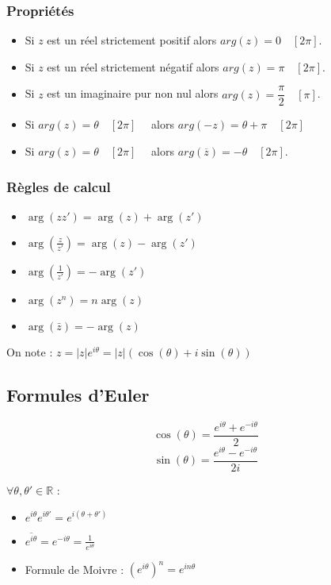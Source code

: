 \documentclass[french]{yLectureNote}
\begin{document}
\subsubsection{Propriétés}
\begin{itemize}
\item Si $z$ est un réel strictement positif alors $arg(z)=0 \quad [2\pi]$.
\item Si $z$ est un réel strictement négatif alors $arg(z)=\pi \quad [2\pi]$.
\item Si $z$ est un imaginaire pur non nul alors $arg(z)=\dfrac{\pi}{2} \quad [\pi]$.
\item Si $arg(z)=\theta \quad [2\pi]\quad $ alors $arg(-z)=\theta+\pi \quad [2\pi]\quad $
\item Si $arg(z)=\theta \quad [2\pi]\quad $ alors  $arg \left( \overline{z}\right) =-\theta \quad [2\pi] $.
\end{itemize}
\subsubsection{Règles de calcul}
\begin{itemize}
\item $\arg(zz') = \arg(z)+\arg(z')$
\item $\arg(\frac{z}{z'}) = \arg(z)-\arg(z')$
\item$\arg(\frac{1}{z'}) = -\arg(z')$
\item$\arg(z^n) = n\arg(z)$
\item$\arg(\bar{z}) = -\arg(z)$
\end{itemize}

On note : $z = |z| e^{i\theta} = |z|( \cos(\theta) + i\sin(\theta))$
\subsection{Formules d'Euler}
\begin{theorem}
\[\cos(\theta) = \frac{e^{i\theta}+e^{-i\theta}}{2}\]
\[\sin(\theta) = \frac{e^{i\theta}-e^{-i\theta}}{2i}\]
\end{theorem}
\begin{theorem}[Propriétés]
$\forall \theta,\theta' \in\mathbb{R}$ :
\begin{itemize}
 \item $e^{i\theta}e^{i\theta'} = e^{i(\theta+\theta')}$
 \item $\overline{e^{i\theta}} = e^{-i\theta} = \frac{1}{e^{i\theta}}$
 \item Formule de Moivre : $(e^{i\theta})^n = e^{in\theta}$
\end{itemize}
\end{theorem}
%
%
%
%
%
\end{document}
